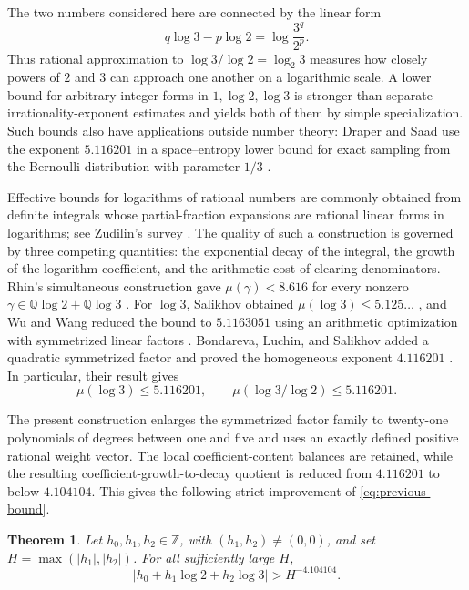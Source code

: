 \documentclass[preprint,12pt]{elsarticle}
\newtheorem{theorem}{Theorem}[section]
\theoremstyle{definition}
\newcommand{\Z}{\mathbb Z}
\newcommand{\abs}[1]{\left|#1\right|}
\begin{document}
The two numbers considered here are connected by the linear form
\[
 q\log3-p\log2=\log\frac{3^q}{2^p}.
\]
Thus rational approximation to $\log3/\log2=\log_2 3$ measures how closely
powers of $2$ and $3$ can approach one another on a logarithmic scale.  A
lower bound for arbitrary integer forms in $1,\log2,\log3$ is stronger than
separate irrationality-exponent estimates and yields both of them by simple
specialization.  Such bounds also have applications outside number theory:
Draper and Saad use the exponent $5.116201$ in a space--entropy lower bound
for exact sampling from the Bernoulli distribution with parameter $1/3$
\cite{DraperSaad2026}.

Effective bounds for logarithms of rational numbers are commonly obtained
from definite integrals whose partial-fraction expansions are rational linear
forms in logarithms; see Zudilin's survey \cite{Zudilin2004}.  The quality of
such a construction is governed by three competing quantities: the
exponential decay of the integral, the growth of the logarithm coefficient,
and the arithmetic cost of clearing denominators.  Rhin's simultaneous
construction gave $\mu(\gamma)<8.616$ for every nonzero
$\gamma\in\mathbb Q\log2+\mathbb Q\log3$ \cite{Rhin1987}.  For $\log3$,
Salikhov
obtained
$\mu(\log3)\le5.125\ldots$ \cite{Salikhov2007}, and Wu and Wang reduced the
bound to $5.1163051$ using an arithmetic optimization with symmetrized linear
factors \cite{WuWang2014}.  Bondareva, Luchin, and Salikhov added a quadratic
symmetrized factor and proved the homogeneous exponent $4.116201$
\cite{BLS2018}.  In particular, their result gives
\begin{equation}\label{eq:previous-bound}
 \mu(\log3)\le5.116201,
 \qquad
 \mu(\log3/\log2)\le5.116201.
\end{equation}

The present construction enlarges the symmetrized factor family to twenty-one
polynomials of degrees between one and five and uses an exactly defined
positive rational weight vector.  The local coefficient-content balances are
retained, while the resulting
coefficient-growth-to-decay quotient is reduced from $4.116201$ to below
$4.104104$.  This gives the following strict
improvement of \eqref{eq:previous-bound}.

\begin{theorem}\label{thm:main}
Let $h_0,h_1,h_2\in\Z$, with $(h_1,h_2)\ne(0,0)$, and set
$H=\max(|h_1|,|h_2|)$.  For all sufficiently large $H$,
\[
 \abs{h_0+h_1\log2+h_2\log3}>H^{-4.104104}.
\]
\end{theorem}
\end{document}
